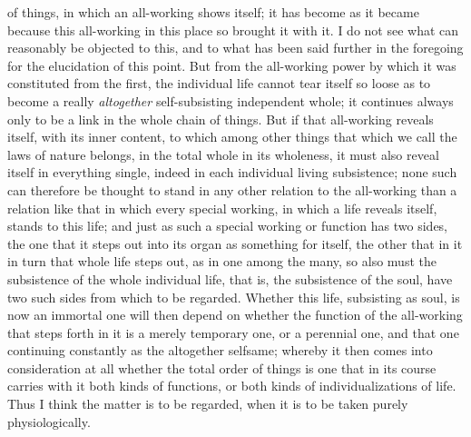 \documentclass[12pt,a4paper,openany]{book}
\newcommand{\opage}[1]{\marginnote{\footnotesize\textit{[#1]}}}
\begin{document}
of
\setcounter{footnote}{0}%
\opage{123}things, in which an all-working shows itself; it has become as it became because
this all-working in this place so brought it with it. I do not see what can
reasonably be objected to this, and to what has been said further in the foregoing
for the elucidation of this point. But from the all-working power by which it was
constituted from the first, the individual life cannot tear itself so loose as to
become a really \emph{altogether} self-subsisting independent whole; it continues
always only to be a link in the whole chain of things. But if that all-working
reveals itself, with its inner content, to which among other things that which we
call the laws of nature belongs, in the total whole in its wholeness, it must also
reveal itself in everything single, indeed in each individual living subsistence;
none such can therefore be thought to stand in any other relation to the all-working
than a relation like that in which every special working, in which a life reveals
itself, stands to this life; and just as such a special working or function has two
sides, the one that it steps out into its organ as something for itself, the other
that in it in turn that whole life steps out, as in one among the many, so also must
the subsistence of the whole individual life, that is, the subsistence of the soul,
have two such sides from which to be regarded. Whether this life, subsisting as
soul, is now an immortal one will then depend on whether the function of the
all-working that steps forth in it is a merely temporary one, or a perennial one,
and that one continuing constantly as the altogether selfsame; whereby it then comes
into consideration at all whether the total order of things is one that in its
course carries with it both kinds of functions, or both kinds of individualizations
of life. Thus I think the matter is to be regarded, when it is to be taken purely
physiologically.
\end{document}
